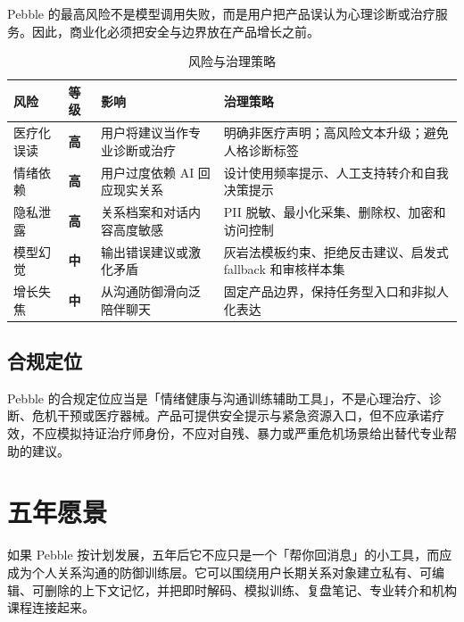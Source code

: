 \documentclass[UTF8,11pt,a4paper]{ctexart}
\newcommand{\thbg}[1]{\textcolor{PebbleInk}{\textbf{#1}}}
\begin{document}
Pebble 的最高风险不是模型调用失败，而是用户把产品误认为心理诊断或治疗服务。因此，商业化必须把安全与边界放在产品增长之前。

\begin{table}[htbp]
\small
\caption{风险与治理策略}
\centering
\begin{tabularx}{\textwidth}{p{2.6cm}p{1.6cm}YY}
\toprule
{}\thbg{风险} & \thbg{等级} & \thbg{影响} & \thbg{治理策略} \\
\midrule
医疗化误读 & {\color{PebbleClay}\textbf{高}} & 用户将建议当作专业诊断或治疗 & 明确非医疗声明；高风险文本升级；避免人格诊断标签 \\
情绪依赖 & {\color{PebbleClay}\textbf{高}} & 用户过度依赖 AI 回应现实关系 & 设计使用频率提示、人工支持转介和自我决策提示 \\
隐私泄露 & {\color{PebbleClay}\textbf{高}} & 关系档案和对话内容高度敏感 & PII 脱敏、最小化采集、删除权、加密和访问控制 \\
模型幻觉 & {\color{PebbleAccent}\textbf{中}} & 输出错误建议或激化矛盾 & 灰岩法模板约束、拒绝反击建议、启发式 fallback 和审核样本集 \\
增长失焦 & {\color{PebbleAccent}\textbf{中}} & 从沟通防御滑向泛陪伴聊天 & 固定产品边界，保持任务型入口和非拟人化表达 \\
\bottomrule
\end{tabularx}
\end{table}

\subsection{合规定位}

Pebble 的合规定位应当是「情绪健康与沟通训练辅助工具」，不是心理治疗、诊断、危机干预或医疗器械。产品可提供安全提示与紧急资源入口，但不应承诺疗效，不应模拟持证治疗师身份，不应对自残、暴力或严重危机场景给出替代专业帮助的建议。

\section{五年愿景}

如果 Pebble 按计划发展，五年后它不应只是一个「帮你回消息」的小工具，而应成为个人关系沟通的防御训练层。它可以围绕用户长期关系对象建立私有、可编辑、可删除的上下文记忆，并把即时解码、模拟训练、复盘笔记、专业转介和机构课程连接起来。
\end{document}

